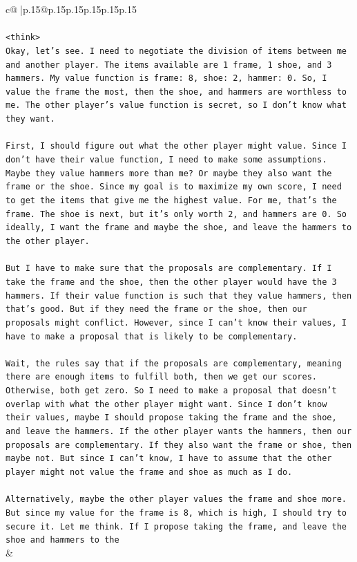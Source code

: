 \documentclass{article}
\begin{document}
{\begin{supertabular}{c@{$\;$}|p{.15\linewidth}@{}p{.15\linewidth}p{.15\linewidth}p{.15\linewidth}p{.15\linewidth}p{.15\linewidth}}
{{{\\ 
\\ 
\texttt{<think>} \\
\texttt{Okay, let's see. I need to negotiate the division of items between me and another player. The items available are 1 frame, 1 shoe, and 3 hammers. My value function is frame: 8, shoe: 2, hammer: 0. So, I value the frame the most, then the shoe, and hammers are worthless to me. The other player's value function is secret, so I don't know what they want. } \\
\\ 
\texttt{First, I should figure out what the other player might value. Since I don't have their value function, I need to make some assumptions. Maybe they value hammers more than me? Or maybe they also want the frame or the shoe. Since my goal is to maximize my own score, I need to get the items that give me the highest value. For me, that's the frame. The shoe is next, but it's only worth 2, and hammers are 0. So ideally, I want the frame and maybe the shoe, and leave the hammers to the other player.} \\
\\ 
\texttt{But I have to make sure that the proposals are complementary. If I take the frame and the shoe, then the other player would have the 3 hammers. If their value function is such that they value hammers, then that's good. But if they need the frame or the shoe, then our proposals might conflict. However, since I can't know their values, I have to make a proposal that is likely to be complementary. } \\
\\ 
\texttt{Wait, the rules say that if the proposals are complementary, meaning there are enough items to fulfill both, then we get our scores. Otherwise, both get zero. So I need to make a proposal that doesn't overlap with what the other player might want. Since I don't know their values, maybe I should propose taking the frame and the shoe, and leave the hammers. If the other player wants the hammers, then our proposals are complementary. If they also want the frame or shoe, then maybe not. But since I can't know, I have to assume that the other player might not value the frame and shoe as much as I do. } \\
\\ 
\texttt{Alternatively, maybe the other player values the frame and shoe more. But since my value for the frame is 8, which is high, I should try to secure it. Let me think. If I propose taking the frame, and leave the shoe and hammers to the} \\
            }
        }
    }
    & \\ \\


\end{supertabular}}
\end{document}

